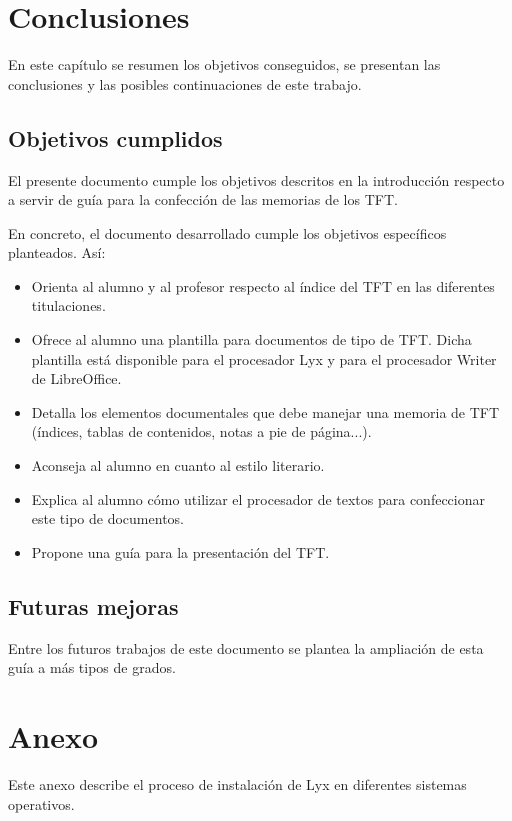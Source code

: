 \documentclass[12pt,spanish,chapterprefix, numbers=noenddot]{book}
\makeatletter
\numberwithin{equation}{section}
\numberwithin{figure}{section}
\renewcommand*{\cleardoublepage}{\clearpage\if@twoside \ifodd\c@page\else
\hbox{}%
\thispagestyle{empty}%
\newpage%
\if@twocolumn\hbox{}\newpage\fi\fi\fi}
\makeatother
\begin{document}
    \chapter{Conclusiones}

    En este capítulo se resumen los objetivos conseguidos, se presentan
    las conclusiones y las posibles continuaciones de este trabajo.

    \section{Objetivos cumplidos}

    El presente documento cumple los objetivos descritos en la introducción
    respecto a servir de guía para la confección de las memorias de los
    TFT.

    En concreto, el documento desarrollado cumple los objetivos específicos
    planteados. Así:
    \begin{itemize}
        \item Orienta al alumno y al profesor respecto al índice del TFT en las
        diferentes titulaciones.
        \item Ofrece al alumno una plantilla para documentos de tipo de TFT. Dicha
        plantilla está disponible para el procesador Lyx y para el procesador
        Writer de LibreOffice.
        \item Detalla los elementos documentales que debe manejar una memoria de
        TFT (índices, tablas de contenidos, notas a pie de página...).
        \item Aconseja al alumno en cuanto al estilo literario.
        \item Explica al alumno cómo utilizar el procesador de textos para confeccionar
        este tipo de documentos.
        \item Propone una guía para la presentación del TFT.
    \end{itemize}

    \section{Futuras mejoras}

    Entre los futuros trabajos de este documento se plantea la ampliación
    de esta guía a más tipos de grados.

    \appendix

    \chapter{Anexo}

    Este anexo describe el proceso de instalación de Lyx en diferentes
    sistemas operativos.

    \section*{\cleardoublepage}

    \printbibliography[heading=bibintoc]

    \printindex
\end{document}
